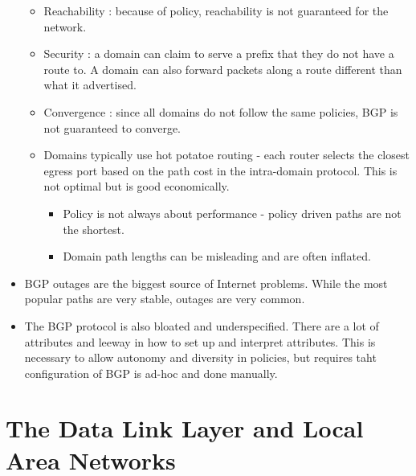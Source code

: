 \documentclass[]{article}
\providecommand{\tightlist}{%
  \setlength{\itemsep}{0pt}\setlength{\parskip}{0pt}}
\begin{document}
\begin{itemize}
  \begin{itemize}
  \tightlist
  \item
    Reachability : because of policy, reachability is not guaranteed for
    the network.
  \item
    Security : a domain can claim to serve a prefix that they do not
    have a route to. A domain can also forward packets along a route
    different than what it advertised.
  \item
    Convergence : since all domains do not follow the same policies, BGP
    is not guaranteed to converge.
  \item
    Domains typically use hot potatoe routing - each router selects the
    closest egress port based on the path cost in the intra-domain
    protocol. This is not optimal but is good economically.

    \begin{itemize}
    \tightlist
    \item
      Policy is not always about performance - policy driven paths are
      not the shortest.
    \item
      Domain path lengths can be misleading and are often inflated.
    \end{itemize}
  \end{itemize}
\item
  BGP outages are the biggest source of Internet problems. While the
  most popular paths are very stable, outages are very common.
\item
  The BGP protocol is also bloated and underspecified. There are a lot
  of attributes and leeway in how to set up and interpret attributes.
  This is necessary to allow autonomy and diversity in policies, but
  requires taht configuration of BGP is ad-hoc and done manually.
\end{itemize}

\hypertarget{the-data-link-layer-and-local-area-networks}{%
\section{The Data Link Layer and Local Area
Networks}\label{the-data-link-layer-and-local-area-networks}}
\end{document}
